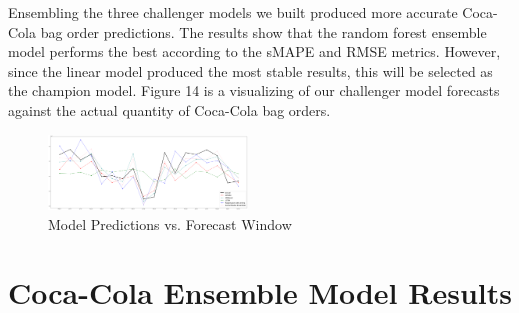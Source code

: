 \documentclass[12pt,oneside]{chicagocapstone}
\begin{document}
Ensembling the three challenger models we built produced more accurate Coca-Cola bag order predictions. The results show that the random forest ensemble model performs the best according to the sMAPE and RMSE metrics. However, since the linear model produced the most stable results, this will be selected as the champion model. Figure 14 is a visualizing of our challenger model forecasts against the actual quantity of Coca-Cola bag orders.
\begin{figure}

{\centering \includegraphics[width=200px,angle = 0, scale=2.5]{figure/timeplot} 

}

\caption{Model Predictions vs. Forecast Window}\label{fig:timeplot}
\end{figure}
\hypertarget{coca-cola-ensemble-model-results}{%
\section*{Coca-Cola Ensemble Model Results}\label{coca-cola-ensemble-model-results}}
\end{document}
